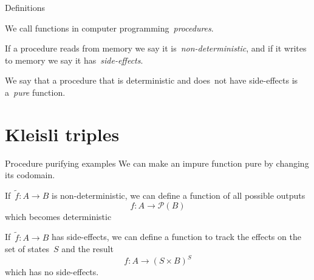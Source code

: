 \documentclass[notes]{beamer}
\begin{document}
\begin{frame}{Definitions}
    \begin{definition}[Procedure]
        We call functions in computer programming~\emph{procedures}.
    \end{definition}

    \pause

    \begin{definition}
        If a procedure reads from memory we say it is~\emph{non-deterministic},
        and if it writes to memory we say it has~\emph{side-effects}.

        We say that a procedure that is deterministic and does~\alert{not} have
        side-effects is a~\emph{pure} function.
    \end{definition}
\end{frame}

\section{Kleisli triples}

\begin{frame}{Procedure purifying examples}
    We can make an impure function pure by changing its codomain.


    \pause

    \begin{example}
        If~\(\tilde{f}:A\longrightarrow B\) is non-deterministic, we can define
        a function of all possible outputs
        \[
            f:A\longrightarrow\mathcal{P}(B)
        \]
        which becomes deterministic
    \end{example}

    \pause

    \begin{example}
        If~\(\tilde{f}:A\longrightarrow B\) has side-effects, we can define a
        function to track the effects on the set of states~\(S\) and the result
        \[
            f:A\longrightarrow(S\times B)^{S}
        \]
        which has no side-effects.
    \end{example}
\end{frame}
\end{document}
